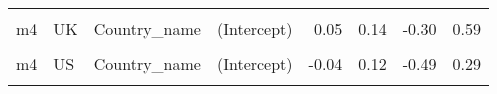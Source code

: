 \begin{table}
\begin{tabular}[t]{llllrrrr}
\cellcolor{gray!10}{m4} & \cellcolor{gray!10}{SE} & \cellcolor{gray!10}{Country\_name} & \cellcolor{gray!10}{EPS} & \cellcolor{gray!10}{-0.09} & \cellcolor{gray!10}{0.07} & \cellcolor{gray!10}{-0.26} & \cellcolor{gray!10}{0.06}\\
m4 & UK & Country\_name & (Intercept) & 0.05 & 0.14 & -0.30 & 0.59\\
\cellcolor{gray!10}{m4} & \cellcolor{gray!10}{UK} & \cellcolor{gray!10}{Country\_name} & \cellcolor{gray!10}{EPS} & \cellcolor{gray!10}{0.09} & \cellcolor{gray!10}{0.07} & \cellcolor{gray!10}{-0.06} & \cellcolor{gray!10}{0.25}\\
m4 & US & Country\_name & (Intercept) & -0.04 & 0.12 & -0.49 & 0.29\\
\cellcolor{gray!10}{m4} & \cellcolor{gray!10}{US} & \cellcolor{gray!10}{Country\_name} & \cellcolor{gray!10}{EPS} & \cellcolor{gray!10}{-0.05} & \cellcolor{gray!10}{0.07} & \cellcolor{gray!10}{-0.21} & \cellcolor{gray!10}{0.10}\\
\bottomrule
\end{tabular}
\end{table}
